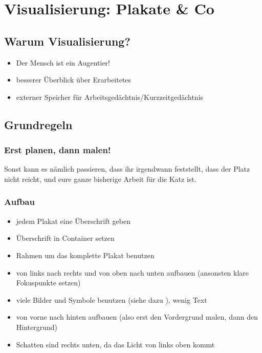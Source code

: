 \section{Visualisierung: Plakate \& Co}
\label{visualisierung}

\subsection{Warum Visualisierung?}
\begin{itemize}
    \item Der Mensch ist ein Augentier!
    \item besserer Überblick über Erarbeitetes
    \item \glqq externer Speicher\grqq{} für Arbeitsgedächtnis/Kurzzeitgedächtnis
\end{itemize}

\subsection{Grundregeln}

\subsubsection{Erst planen, dann malen!}
Sonst kann es nämlich passieren, dass ihr irgendwann feststellt, dass der Platz nicht reicht, und eure ganze bisherige Arbeit für die Katz ist.

\subsubsection{Aufbau}
\begin{itemize}
    \item jedem Plakat eine Überschrift geben
    \item Überschrift in Container setzen
    \item Rahmen um das komplette Plakat benutzen
    \item von links nach rechts und von oben nach unten aufbauen (ansonsten klare Fokuspunkte setzen)
    \item viele Bilder und Symbole benutzen (siehe dazu \cite{bikablo}), wenig Text
    \item von vorne nach hinten aufbauen (also erst den Vordergrund malen, dann den Hintergrund)
    \item Schatten sind rechts unten, da das Licht von links oben kommt
\end{itemize}

